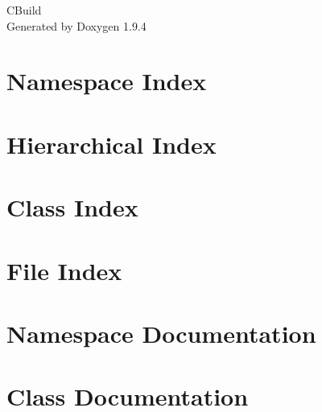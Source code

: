 \documentclass[twoside]{book}
\newcommand{\+}{\discretionary{\mbox{\scriptsize$\hookleftarrow$}}{}{}}
\newcommand{\clearemptydoublepage}{%
    \newpage{\pagestyle{empty}\cleardoublepage}%
  }
\begin{document}
  \raggedbottom
    \hypersetup{pageanchor=false,
                bookmarksnumbered=true,
                pdfencoding=unicode
               }
  \begin{titlepage}
  \vspace*{7cm}
  \begin{center}%
  {\Large CBuild}\\
  \vspace*{1cm}
  {\large Generated by Doxygen 1.9.4}\\
  \end{center}
  \end{titlepage}
  \clearemptydoublepage
  \tableofcontents
  \clearemptydoublepage
  \hypersetup{pageanchor=true}
\chapter{Namespace Index}

\chapter{Hierarchical Index}

\chapter{Class Index}

\chapter{File Index}

\chapter{Namespace Documentation}







\chapter{Class Documentation}


















\end{document}
